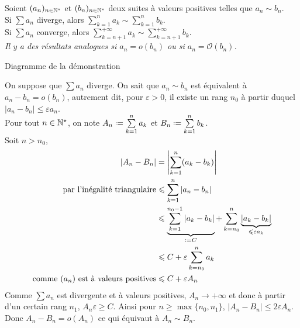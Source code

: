 \begin{prop}
    Soient $(a_n)_{n \in \mathbb{N}^\star}$ et $(b_n)_{n \in \mathbb{N}^\star}$ deux suites à valeurs positives telles que $a_n \sim b_n$.\\
    Si $ \sum a_n$ diverge, alors $\sum\limits_{k=1}^{n} a_k \sim \sum\limits_{k=1}^{n} b_k$. \\
    Si $ \sum a_n$ converge, alors $\sum\limits_{k=n+1}^{+ \infty} a_k \sim \sum\limits_{k=n+1}^{+ \infty} b_k$. \\
    \emph{Il y a des résultats analogues si $a_n = o(b_n)$ ou si $a_n = \mathcal{O}(b_n)$.}
\end{prop}

\begin{marginfigure}[3cm]
    \centering
    \caption*{\centering Diagramme de la démonstration}
\end{marginfigure}

\begin{preuve}
    On suppose que $\sum a_n$ diverge. On sait que $a_n \sim b_n$ est équivalent à $a_n -b_n = o(b_n)$, autrement dit, pour $\varepsilon > 0$, il existe un rang $n_0$ à partir duquel $|a_n -b_n| \leqslant \varepsilon a_n$. \\
    Pour tout $n \in \mathbb{N}^\star$, on note $A_n \defeq \sum\limits_{k=1}^n a_k$ et $B_n \defeq \sum\limits_{k=1}^n b_k$. \\
    Soit $n > n_0$,
    \begin{align*}
        |A_n - B_n| &= \left|\sum_{k=1}^n (a_k - b_k) \right| \\
        \text{par l'inégalité triangulaire} &\leqslant \sum_{k=1}^n |a_n-b_n| \\
        &\leqslant \underbrace{\sum_{k=1}^{n_0-1} |a_k - b_k|}_{\defeq C} + \sum_{k=n_0}^n \underbrace{|a_k - b_k|}_{\leqslant \varepsilon a_k} \\
        &\leqslant C + \varepsilon \sum_{k=n_0}^n a_k \\
        \text{comme $(a_n)$ est à valeurs positives} &\leqslant C + \varepsilon A_n
    \end{align*}
    Comme $\sum a_n$ est divergente et à valeurs positives, $A_n \longrightarrow +\infty$ et donc à partir d'un certain rang $n_1$, $A_n \varepsilon \geqslant C$. Ainsi pour $n \geqslant \max \{ n_0, n_1 \}$, $|A_n - B_n| \leqslant 2 \varepsilon A_n$. \\ 
    Donc $A_n - B_n = o(A_n)$ ce qui équivaut à $A_n \sim B_n$.
\end{preuve}
